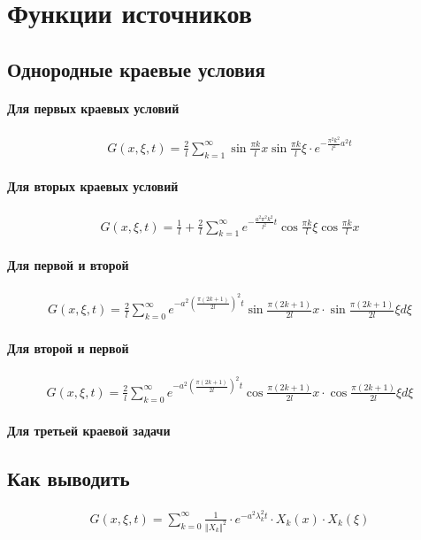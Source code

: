 \documentclass{article}[12pt]
\begin{document}
\section{Функции источников}
\subsection{Однородные краевые условия}
\paragraph{Для первых краевых условий}
\begin{eqnarray*}
    G(x,\xi,t)
    =\frac{2}{l}\sum\limits_{k=1}^{\infty}
    \sin{\frac{\pi k}{l}x}
    \sin{\frac{\pi k}{l}\xi}
    \cdot e^{-\frac{\pi^{2}k^{2}}{l^{2}}a^{2}t}
\end{eqnarray*}

\paragraph{Для вторых краевых условий}
\begin{eqnarray*}
    G(x,\xi,t)=\frac{1}{l}+\frac{2}{l}\sum\limits_{k=1}^{\infty}
    e^{-\frac{a^{2}\pi^{2}k^{2}}{l^{2}}t}\cos{\frac{\pi k}{l}\xi}
    \cos{\frac{\pi k}{l}x}
\end{eqnarray*}
\paragraph{Для первой и второй}
\begin{eqnarray*}
    G(x,\xi,t)
    =\frac{2}{l}\sum\limits_{k=0}^{\infty}
    e^{-a^{2}(\frac{\pi(2k+1)}{2l})^{2}t}
    \sin{\frac{\pi(2k+1)}{2l}x}
    \cdot\sin{\frac{\pi(2k+1)}{2l}\xi}d\xi
\end{eqnarray*}
\paragraph{Для второй и первой}
\begin{eqnarray*}
    G(x,\xi,t)
    =\frac{2}{l}\sum\limits_{k=0}^{\infty}
    e^{-a^{2}(\frac{\pi(2k+1)}{2l})^{2}t}
    \cos{\frac{\pi(2k+1)}{2l}x}
    \cdot\cos{\frac{\pi(2k+1)}{2l}\xi}d\xi
\end{eqnarray*}

\paragraph{Для третьей краевой задачи}
\subsection{Как выводить}
\begin{eqnarray*}
    G(x,\xi,t)
    =\sum\limits_{k=0}^{\infty}\frac{1}{\Vert X_{k} \Vert^{2}}
    \cdot e^{-a^{2}\lambda_{k}^{2}t}
    \cdot X_{k}(x)\cdot X_{k}(\xi)
\end{eqnarray*}
\end{document}
